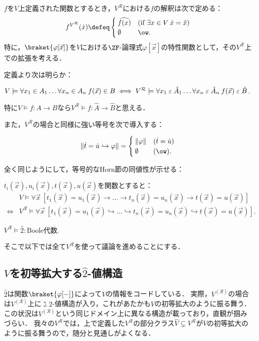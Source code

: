 \documentclass[realisability.tex]{subfiles}
\begin{document}
\begin{definition}
 $f$を$V$上定義された関数とするとき，$V^{\mathcal{R}}$における$f$の解釈は次で定める：
 \[
  f^{V^{\mathcal{R}}}(\dot{x}) \defeq
 \begin{cases}
  \widehat{f(x)} & (\text{if } \exists x \in V \: \dot{x} = \hat{x})\\
  \emptyset & \ow.
 \end{cases}
 \]
 特に，$\braket{\varphi[\vec{x}]}$を$V$における$\ZF$-論理式$\varphi[\vec{x}]$の特性関数として，その$V^{\mathcal{R}}$上での拡張を考える．
\end{definition}
定義より次は明らか：
\begin{lemma}
 $V \models \forall x_1 \in A_1 \dots \forall x_n \in A_n \: f(\vec{x}) \in B \iff V^{\mathcal{R}} \models \forall x_1 \mathrel{\varepsilon} \hat{A}_1 \dots \forall x_n \mathrel{\varepsilon} \hat{A}_n \: f(\vec{x}) \mathrel{\varepsilon} \hat{B}$.

 特に$V \models f: A \to B$なら$V^{\mathcal{R}} \models f: \hat{A} \to \hat{B}$と思える．
\end{lemma}
また，$V^{\mathcal{R}}$の場合と同様に強い等号を次で導入する：
\begin{definition}
 \[
 \|\dot{t} = \dot{u} \hookrightarrow \varphi \| =
 \begin{cases}
  \|\varphi\| & (\dot{t} = \dot{u})\\
  \emptyset & (\ow).
 \end{cases}
 \]
\end{definition}
全く同じようにして，等号的なHorn節の同値性が示せる：
\begin{lemma}
 $t_i(\vec{x}), u_i(\vec{x}), t(\vec{x}), u(\vec{x})$を関数とすると：
 \begin{align*}
  &V \models \forall \vec{x}\:\left[t_1(\vec{x}) = u_1(\vec{x}) \to \dots \to t_n(\vec{x}) = u_n(\vec{x}) \to t(\vec{x}) = u(\vec{x})\right]\\
 \iff
 &V^{\mathcal{R}} \models \forall \vec{x}\:\left[t_1(\vec{x}) = u_1(\vec{x}) \hookrightarrow \dots \hookrightarrow t_n(\vec{x}) = u_n(\vec{x}) \hookrightarrow t(\vec{x}) = u(\vec{x})\right].
 \end{align*}
\end{lemma}
\begin{corollary}
 $V^{\mathcal{R}} \models \hat{2}: \text{Boole代数}$.
\end{corollary}
そこで以下では全て$V^{\mathcal{R}}$を使って議論を進めることにする．

\subsection{$V$を初等拡大する$\hat{2}$-値構造}
$\hat{2}$は関数$\braket{ \varphi[-] }$によって$V$の情報をコードしている．
実際，$V^{(\mathcal{R})}$の場合は$V^{(\mathcal{R})}$上に$\gimel 2$-値構造が入り，これがあたかも$V$の初等拡大のように振る舞う．
この状況は$V^{(\mathcal{R})}$という同じドメイン上に異なる構造が載っており，直観が掴みづらい．
我々の$V^{\mathcal{R}}$では，上で定義した$V^{\mathcal{R}}$の部分クラス$\hat{V} \subsetneq V^{\mathcal{R}}$が$V$の初等拡大のように振る舞うので，随分と見通しがよくなる．
\end{document}
